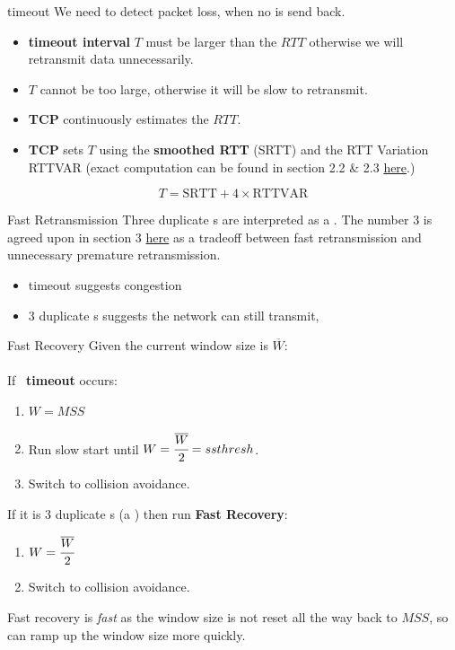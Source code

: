 \begin{definitionbox}{timeout}
    We need to detect packet loss, when no  is send back.
    \begin{itemize}
        \setlength\itemsep{0em}
        \item \textbf{timeout interval} $T$ must be larger than the $RTT$ otherwise we will retransmit data unnecessarily.
        \item $T$ cannot be too large, otherwise it will be slow to retransmit.
        \item \textbf{TCP} continuously estimates the $RTT$.
        \item \textbf{TCP} sets $T$ using the \textbf{smoothed RTT} (SRTT) and the RTT Variation RTTVAR (exact computation can be found in section 2.2 \& 2.3 \href{https://datatracker.ietf.org/doc/html/rfc6298}{here}.)
    \end{itemize}
    \[T = \text{SRTT} + 4 \times \text{RTTVAR}\]
\end{definitionbox}
\begin{definitionbox}{Fast Retransmission}
    Three duplicate s are interpreted as a . The number $3$ is agreed upon in section 3 \href{https://datatracker.ietf.org/doc/html/rfc2001}{here} as a tradeoff between fast retransmission and unnecessary premature retransmission.
    \begin{itemize}
        \setlength\itemsep{0em}
        \item timeout suggests congestion
        \item 3 duplicate s suggests the network can still transmit,
    \end{itemize}
\end{definitionbox}
\begin{definitionbox}{Fast Recovery}
    Given the current window size is $\overline{W}$:
    \\
    \\ If \ \textbf{timeout} occurs:
    \begin{enumerate}
        \setlength\itemsep{0em}
        \item $W = MSS$
        \item Run slow start until $W = \cfrac{\overline{W}}{2} = ssthresh$.
        \item Switch to collision avoidance.
    \end{enumerate}
    If it is 3 duplicate s (a ) then run \textbf{Fast Recovery}:
    \begin{enumerate}
        \setlength\itemsep{0em}
        \item $W = \cfrac{\overline{W}}{2}$
        \item Switch to collision avoidance.
    \end{enumerate}
    Fast recovery is \textit{fast} as the window size is not reset all the way back to $MSS$, so can ramp up the window size more quickly.
\end{definitionbox}

